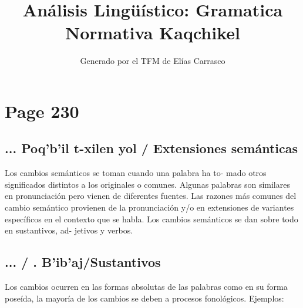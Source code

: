 \documentclass{article}%
\title{Análisis Lingüístico: Gramatica Normativa Kaqchikel}%
\author{Generado por el TFM de Elías Carrasco}%
\begin{document}
%
\normalsize%
\maketitle%
\section{Page 230}%
\label{sec:Page230}%
\subsection{... Poq’b’il t{-}xilen yol / Extensiones semánticas}%
\label{subsec:...Poqbilt{-}xilenyol/Extensionessemnticas}%

%
Los cambios semánticos se toman cuando una palabra ha to{-} %
mado otros significados distintos a los originales o comunes. %
Algunas palabras son similares en pronunciación pero vienen %
de diferentes fuentes. %
Las razones más comunes del cambio semántico provienen de %
la pronunciación y/o en extensiones de variantes específicos %
en el contexto que se habla. %
Los cambios semánticos se dan sobre todo en sustantivos, ad{-} %
jetivos y verbos. %
\subsection{... / . B’ib’aj/Sustantivos}%
\label{subsec:.../.Bibaj/Sustantivos}%

%
Los cambios ocurren en las formas absolutas de las palabras %
como en su forma poseída, la mayoría de los cambios se deben %
a procesos fonológicos. %
Ejemplos: 

%
\end{document}
